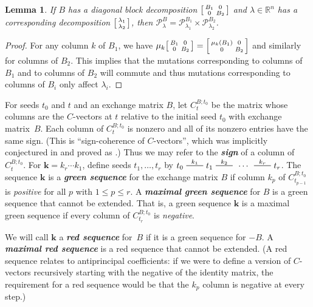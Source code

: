 \documentclass{amsart}
\newtheorem{lemma}[proposition]{Lemma}
\theoremstyle{definition}
\theoremstyle{remark}
\numberwithin{equation}{section}
\newcommand{\newword}[1]{\textbf{\emph{#1}}}
\newcommand{\reals}{\mathbb R}
\newcommand{\edge}{\,\,\rule[2.7pt]{20pt}{0.5pt}\,\,}
\newcommand{\0}{{\mathbf{0}}}
\newcommand{\kk}{{\boldsymbol{k}}}
\renewcommand{\P}{\mathcal{P}}
\begin{document}
\begin{lemma}\label{block dom}
If $B$ has a diagonal block decomposition $\begin{bsmallmatrix}B_1&0\\0&B_2\end{bsmallmatrix}$ and $\lambda\in\reals^n$ has a corresponding decomposition $\begin{bsmallmatrix}\lambda_1\\\lambda_2\end{bsmallmatrix}$, then $\P_\lambda^B=\P_{\lambda_1}^{B_1}\times\P_{\lambda_2}^{B_2}$.
\end{lemma}
\begin{proof}
  For any column $k$ of $B_1$, we have $\mu_k\begin{bsmallmatrix}B_1&0\\0&B_2\end{bsmallmatrix}=\begin{bsmallmatrix}\mu_k(B_1)&0\\0&B_2\end{bsmallmatrix}$ and similarly for columns of $B_2$.
  This implies that the mutations corresponding to columns of $B_1$ and to columns of $B_2$ will commute and thus mutations corresponding to columns of $B_i$ only affect $\lambda_i$.
\end{proof}

For seeds $t_0$ and $t$ and an exchange matrix $B$, let $C_t^{B;t_0}$ be the matrix whose columns are the $C$-vectors at $t$ relative to the initial seed $t_0$ with exchange matrix~$B$.
Each column of $C_t^{B;t_0}$ is nonzero and all of its nonzero entries have the same sign.
(This is ``sign-coherence of $C$-vectors'', which was implicitly conjectured in \cite{ca4} and proved as \cite[Corollary~5.5]{GHKK}.)
Thus we may refer to the \newword{sign} of a column of $C_t^{B;t_0}$.
For $\kk=k_r\cdots k_1$, define seeds $t_1,\ldots,t_r$ by $t_0\overset{k_1}{\edge}t_1\overset{k_2}{\edge}\,\cdots\,\overset{k_r}{\edge}t_r$.
The sequence $\kk$ is a \newword{green sequence} for the exchange matrix $B$ if column $k_p$ of $C_{t_{p-1}}^{B;t_0}$ is \emph{positive} for all $p$ with $1\le p\le r$.
A \newword{maximal green sequence} for $B$ is a green sequence that cannot be extended.
That is, a green sequence $\kk$ is a maximal green sequence if every column of $C_{t_r}^{B;t_0}$ is \emph{negative}.

We will call $\kk$ a \newword{red sequence} for~$B$ if it is a green sequence for $-B$.
A \newword{maximal red sequence} is a red sequence that cannot be extended.
(A red sequence relates to antiprincipal coefficients: 
if we were to define a version of $C$-vectors recursively starting with the negative of the identity matrix, the requirement for a red sequence would be that the $k_p$ column is negative at every step.)
\end{document}
